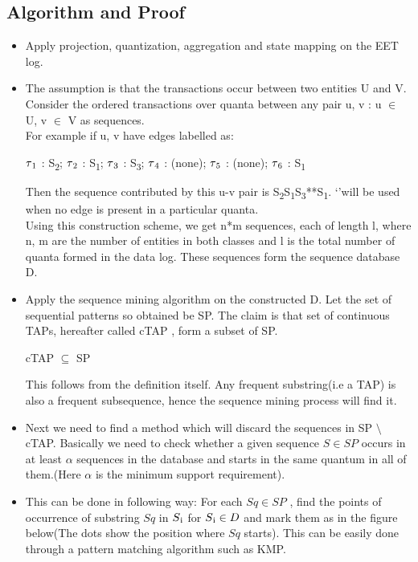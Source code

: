 \documentclass{article}
\begin{document}
\subsection{Algorithm and Proof}
\begin{itemize}
\item Apply projection, quantization, aggregation and state mapping on the EET log.
\item The assumption is that the transactions occur between two entities U and V. Consider the ordered transactions over quanta between any pair u, v : u $\in$ U, v $\in$ V as sequences. \\
For example if u, v have edges labelled as:
\begin{center}
$\tau\textsubscript{1}$ : S\textsubscript{2};  $\tau\textsubscript{2}$ : S\textsubscript{1};   $\tau\textsubscript{3}$ : S\textsubscript{3};   $\tau\textsubscript{4}$ : (none);   $\tau\textsubscript{5}$ : (none);   $\tau\textsubscript{6}$ : S\textsubscript{1}
\end{center}
Then the sequence contributed by this u-v pair is S\textsubscript{2}S\textsubscript{1}S\textsubscript{3}**S\textsubscript{1}. \lq*\rq  will be used when no edge is present in a particular quanta.\\
Using this construction scheme, we get n*m sequences, each of length l, where n, m are the number of entities in both classes and l is the total number of quanta formed in the data log. These sequences form the sequence database D.
\item Apply the sequence mining algorithm on the constructed D. Let the set of sequential patterns so obtained be SP. The claim is that set of continuous TAPs, hereafter called cTAP , form a subset of SP.\\
\begin{center}
cTAP $\subseteq$ SP 
\end{center}
This follows from the definition itself. Any frequent substring(i.e a TAP) is also a frequent subsequence, hence the sequence mining process will find it.
\item Next we need to find a method which will discard the sequences in SP $\setminus$ cTAP. Basically we need to check whether a given sequence $ S \in SP $ occurs in at least $\alpha$ sequences in the database and starts in the same quantum in all of them.(Here $\alpha$ is the minimum support requirement). 
\item This can be done in following way: For each $Sq \in SP$ , find the points of occurrence of substring $Sq$ in $S\textsubscript{i}$ for $S\textsubscript{i} \in D$ and mark them as in the figure below(The dots show the position where $Sq$ starts). This can be easily done through a pattern matching algorithm such as KMP. \\
\begin{center} 
\end{center}
\end{itemize}
\end{document}
